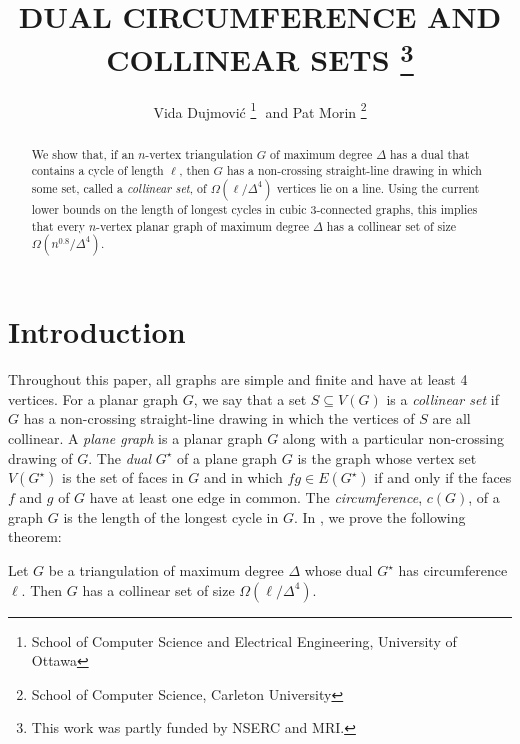 \documentclass{patmorin}
\title{\MakeUppercase{Dual Circumference and Collinear Sets}%
    \thanks{This work was partly funded by NSERC and MRI.}}
\author{Vida Dujmovi\'c%
        \thanks{School of Computer Science and Electrical Engineering,
                University of Ottawa}\,\, and
        Pat Morin%
        \thanks{School of Computer Science, Carleton University}}
\newcommand{\dual}[1]{{#1}^\star}
\begin{document}
\maketitle


\begin{abstract}
   We show that, if an $n$-vertex triangulation $G$ of maximum degree
   $\Delta$ has a dual that contains a cycle of length $\ell$, then $G$
   has a non-crossing straight-line drawing in which some set, called
   a \emph{collinear set}, of $\Omega(\ell/\Delta^4)$ vertices lie on
   a line.  Using the current lower bounds on the length of longest cycles
   in cubic 3-connected graphs, this implies that every $n$-vertex
   planar graph of maximum degree $\Delta$ has a collinear set of size
   $\Omega(n^{0.8}/\Delta^4)$.
\end{abstract}

\section{Introduction}

Throughout this paper, all graphs are simple and finite and have at least
4 vertices.  For a planar graph $G$, we say that a set $S\subseteq V(G)$
is a \emph{collinear set} if $G$ has a non-crossing straight-line drawing
in which the vertices of $S$ are all collinear.  A \emph{plane graph} is
a planar graph $G$ along with a particular non-crossing drawing of $G$.
The \emph{dual} $\dual{G}$ of a plane graph $G$ is the graph whose
vertex set $V(\dual{G})$ is the set of faces in $G$ and in which $fg\in
E(\dual{G})$ if and only if the faces $f$ and $g$ of $G$ have at least
one edge in common.  The \emph{circumference}, $c(G)$, of a graph $G$
is the length of the longest cycle in $G$. In , we prove
the following theorem:

\begin{thm}
  Let $G$ be a triangulation of maximum degree $\Delta$ whose dual
  $\dual{G}$ has circumference $\ell$. Then $G$ has a collinear set of
  size $\Omega(\ell/\Delta^4)$.
\end{thm}
\end{document}
